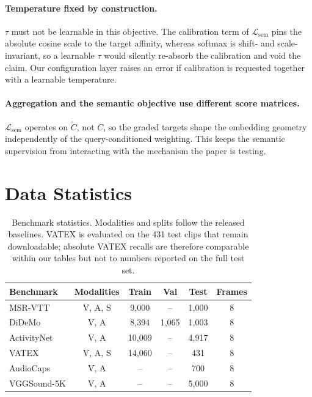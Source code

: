 \documentclass[10pt,twocolumn,letterpaper]{article}
\begin{document}
\paragraph{Temperature fixed by construction.}
$\tau$ must not be learnable in this objective. The calibration term of
$\mathcal{L}_{\mathrm{sem}}$ pins the absolute cosine scale to the target
affinity, whereas softmax is shift- and scale-invariant, so a learnable $\tau$
would silently re-absorb the calibration and void the claim. Our configuration
layer raises an error if calibration is requested together with a learnable
temperature.

\paragraph{Aggregation and the semantic objective use different score
matrices.}
$\mathcal{L}_{\mathrm{sem}}$ operates on $\tilde{C}$, not $C$, so the graded
targets shape the embedding geometry independently of the query-conditioned
weighting. This keeps the semantic supervision from interacting with the
mechanism the paper is testing.

\section{Data Statistics}
\label{sec:data}

\begin{table}[t]
\centering
\caption{Benchmark statistics. Modalities and splits follow the released
baselines. VATEX is evaluated on the 431 test clips that remain downloadable;
absolute VATEX recalls are therefore comparable within our tables but not to
numbers reported on the full test set.}
\label{tab:datastats}
\small
\setlength{\tabcolsep}{4pt}
\begin{tabular}{lccccc}
\toprule
Benchmark & Modalities & Train & Val & Test & Frames \\
\midrule
MSR-VTT & V, A, S & 9{,}000 & -- & 1{,}000 & 8 \\
DiDeMo & V, A & 8{,}394 & 1{,}065 & 1{,}003 & 8 \\
ActivityNet & V, A & 10{,}009 & -- & 4{,}917 & 8 \\
VATEX & V, A, S & 14{,}060 & -- & 431 & 8 \\
AudioCaps & V, A & -- & -- & 700 & 8 \\
\midrule
VGGSound-5K & V, A & -- & -- & 5{,}000 & 8 \\
\bottomrule
\end{tabular}
\end{table}
\end{document}

